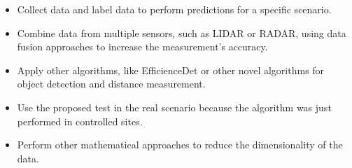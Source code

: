 \begin{itemize}
    \item Collect data and label data to perform predictions for a specific scenario.
    \item Combine data from multiple sensors, such as LIDAR or RADAR, using data fusion approaches to increase the measurement's accuracy. 
    \item Apply other algorithms, like EfficienceDet or other novel algorithms for object detection and distance measurement.
    \item Use the proposed test in the real scenario because the algorithm was just performed in controlled sites. 
    \item Perform other mathematical approaches to reduce the dimensionality of the data.
\end{itemize}